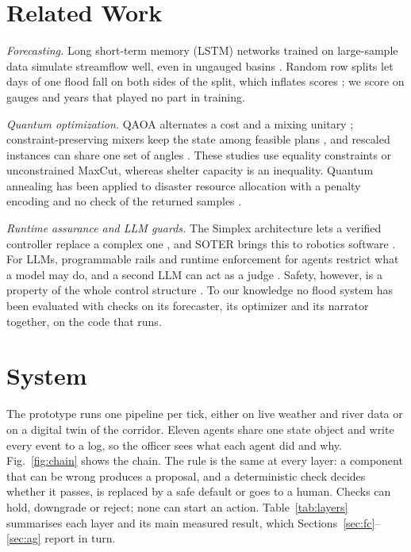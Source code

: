 \documentclass[conference]{IEEEtran}
\begin{document}
\section{Related Work}
\textit{Forecasting.} Long short-term memory (LSTM) networks trained on large-sample data simulate streamflow well, even in ungauged basins \cite{Kratzert2019a,Nearing2024}. Random row splits let days of one flood fall on both sides of the split, which inflates scores \cite{Kapoor2023,Roberts2017}; we score on gauges and years that played no part in training.

\textit{Quantum optimization.} QAOA alternates a cost and a mixing unitary \cite{Farhi2014}; constraint-preserving mixers keep the state among feasible plans \cite{Hadfield2019,WangZ2020}, and rescaled instances can share one set of angles \cite{Shaydulin2023}. These studies use equality constraints or unconstrained MaxCut, whereas shelter capacity is an inequality. Quantum annealing has been applied to disaster resource allocation with a penalty encoding and no check of the returned samples \cite{Cadelina2024}.

\textit{Runtime assurance and LLM guards.} The Simplex architecture lets a verified controller replace a complex one \cite{Sha2001}, and SOTER brings this to robotics software \cite{Desai2019}. For LLMs, programmable rails \cite{Rebedea2023} and runtime enforcement for agents \cite{WangH2026} restrict what a model may do, and a second LLM can act as a judge \cite{Zheng2023}. Safety, however, is a property of the whole control structure \cite{Leveson2011}. To our knowledge no flood system has been evaluated with checks on its forecaster, its optimizer and its narrator together, on the code that runs.

\section{System}\label{sec:sys}
The prototype runs one pipeline per tick, either on live weather and river data or on a digital twin of the corridor. Eleven agents share one state object and write every event to a log, so the officer sees what each agent did and why. Fig.~\ref{fig:chain} shows the chain. The rule is the same at every layer: a component that can be wrong produces a proposal, and a deterministic check decides whether it passes, is replaced by a safe default or goes to a human. Checks can hold, downgrade or reject; none can start an action. Table~\ref{tab:layers} summarises each layer and its main measured result, which Sections~\ref{sec:fc}--\ref{sec:ag} report in turn.
\end{document}
